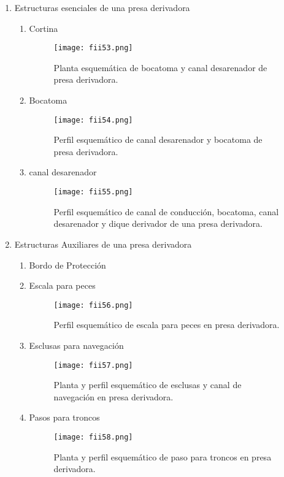 \begin{enumerate}
	\item Estructuras esenciales de una presa derivadora
	      \begin{enumerate}
		      \item Cortina
		            \begin{figure}[h!]
			            \centerline{\texttt{[image: fii53.png]}}
			            \caption{Planta esquemática de bocatoma y canal desarenador de presa derivadora.}
			            \label{fii53}
		            \end{figure}
		      \item Bocatoma
		            \begin{figure}[h!]
			            \centerline{\texttt{[image: fii54.png]}}
			            \caption{Perfil esquemático de canal desarenador y bocatoma de presa derivadora.}
			            \label{fii54}
		            \end{figure}
		      \item canal desarenador
		            \begin{figure}[h!]
			            \centerline{\texttt{[image: fii55.png]}}
			            \caption{Perfil esquemático de canal de conducción, bocatoma, canal desarenador y dique derivador de una presa derivadora.}
			            \label{fii55}
		            \end{figure}
	      \end{enumerate}
	\item Estructuras Auxiliares de una presa derivadora
	      \begin{enumerate}
		      \item Bordo de Protección
		      \item Escala para peces
		            \begin{figure}[h!]
			            \centerline{\texttt{[image: fii56.png]}}
			            \caption{Perfil esquemático de escala para peces en presa derivadora.}
			            \label{fii56}
		            \end{figure}
		      \item Esclusas para navegación
		            \begin{figure}[h!]
			            \centerline{\texttt{[image: fii57.png]}}
			            \caption {Planta y perfil esquemático de esclusas y canal de navegación en presa derivadora.}
			            \label{fii57}
		            \end{figure}
		      \item Pasos para troncos
		            \begin{figure}[h!]
			            \centerline{\texttt{[image: fii58.png]}}
			            \caption {Planta y perfil esquemático de paso para troncos en presa derivadora.}
			            \label{fii58}
		            \end{figure}
	      \end{enumerate}
\end{enumerate}

